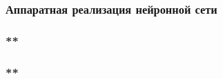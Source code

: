 \begin{frame}
\frametitle{Аппаратная реализация нейронной сети}

\end{frame}
\begin{frame}
    \frametitle{**}

\end{frame}

\begin{frame}[t]
    \frametitle{**}

\end{frame}

